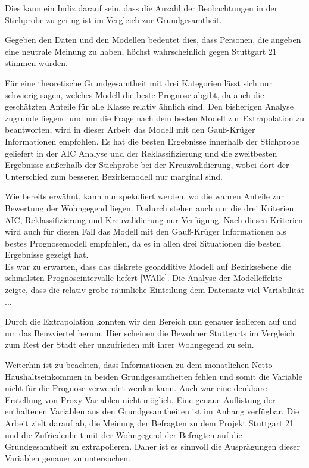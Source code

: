 \documentclass{Vorlage}
\begin{document}
Dies kann ein Indiz darauf sein, dass die Anzahl der Beobachtungen in der Stichprobe zu gering ist im Vergleich zur Grundgesamtheit.

 Gegeben den Daten und den Modellen bedeutet dies, dass Personen, die angeben eine neutrale Meinung zu haben, höchst wahrscheinlich gegen Stuttgart 21 stimmen würden. 

Für eine theoretische Grundgesamtheit mit drei Kategorien lässt sich nur schwierig sagen, welches Modell die beste Prognose abgibt, da auch die geschätzten Anteile für alle Klasse relativ ähnlich sind. Den bisherigen Analyse zugrunde liegend und um die Frage nach dem besten Modell zur Extrapolation zu beantworten, wird in dieser Arbeit das Modell mit den Gauß-Krüger Informationen empfohlen. Es hat die besten Ergebnisse innerhalb der Stichprobe geliefert in der AIC Analyse  und der Reklassifizierung und die zweitbesten Ergebnisse außerhalb der Stichprobe bei der Kreuzvalidierung, wobei dort der Unterschied zum besseren Bezirkemodell nur marginal sind.

Wie bereits erwähnt, kann nur spekuliert werden, wo die wahren Anteile zur Bewertung der Wohngegend liegen. Dadurch stehen auch nur die drei Kriterien AIC, Reklassifizierung und Kreuvalidierung nur Verfügung. Nach diesen Kriterien wird auch für diesen Fall das Modell mit den Gauß-Krüger Informationen als bestes Prognosemodell empfohlen, da es in allen drei Situationen die besten Ergebnisse gezeigt hat.\\

Es war zu erwarten, dass das diskrete geoadditive Modell auf Bezirksebene die schmalsten Prognoseintervalle liefert \ref{WAlle}. Die Analyse der Modelleffekte zeigte, dass die relativ grobe räumliche Einteilung dem Datensatz viel Variabilität ... 

Durch die Extrapolation konnten wir den Bereich nun genauer isolieren auf und um das Benzviertel herum. Hier scheinen die Bewohner Stuttgarts im Vergleich zum Rest der Stadt eher unzufrieden mit ihrer Wohngegend zu sein.

Weiterhin ist zu beachten, dass Informationen zu dem monatlichen Netto Haushaltseinkommen in beiden Grundgesamtheiten fehlen und somit die Variable nicht für die Prognose verwendet werden kann. Auch war eine denkbare Erstellung von Proxy-Variablen nicht möglich. Eine genaue Auflistung der enthaltenen Variablen aus den Grundgesamtheiten ist im Anhang verfügbar. Die Arbeit zielt darauf ab, die Meinung der Befragten zu dem Projekt Stuttgart 21 und die Zufriedenheit mit der Wohngegend der Befragten auf die Grundgesamtheit zu extrapolieren. Daher ist es sinnvoll die Ausprägungen dieser Variablen genauer zu untersuchen.\\
\end{document}
